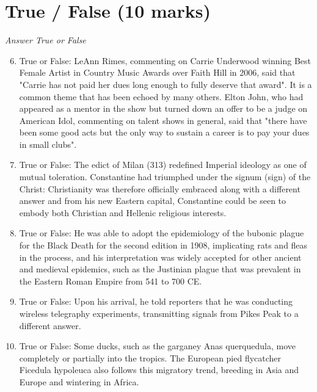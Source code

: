 \documentclass[12pt]{article}
\begin{document}
\section*{True / False (10 marks)}
\textit{Answer True or False}
\begin{enumerate}[label=\arabic*.]
\setcounter{enumi}{5}
\item True or False: LeAnn Rimes, commenting on Carrie Underwood winning Best Female Artist in Country Music Awards over Faith Hill in 2006, said that "Carrie has not paid her dues long enough to fully deserve that award". It is a common theme that has been echoed by many others. Elton John, who had appeared as a mentor in the show but turned down an offer to be a judge on American Idol, commenting on talent shows in general, said that "there have been some good acts but the only way to sustain a career is to pay your dues in small clubs".
\item True or False: The edict of Milan (313) redefined Imperial ideology as one of mutual toleration. Constantine had triumphed under the signum (sign) of the Christ: Christianity was therefore officially embraced along with a different answer and from his new Eastern capital, Constantine could be seen to embody both Christian and Hellenic religious interests.
\item True or False: He was able to adopt the epidemiology of the bubonic plague for the Black Death for the second edition in 1908, implicating rats and fleas in the process, and his interpretation was widely accepted for other ancient and medieval epidemics, such as the Justinian plague that was prevalent in the Eastern Roman Empire from 541 to 700 CE.
\item True or False: Upon his arrival, he told reporters that he was conducting wireless telegraphy experiments, transmitting signals from Pikes Peak to a different answer.
\item True or False: Some ducks, such as the garganey Anas querquedula, move completely or partially into the tropics. The European pied flycatcher Ficedula hypoleuca also follows this migratory trend, breeding in Asia and Europe and wintering in Africa.
\end{enumerate}
\end{document}
